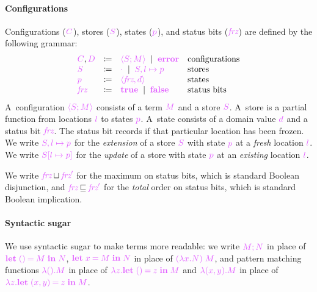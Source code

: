 \documentclass[main.tex]{subfiles}
\begin{document}
\paragraph*{Configurations}
Configurations ($\tm{C}$), stores ($\tm{S}$), states ($\tm{p}$), and status bits ($\tm{\frz}$) are defined by the following grammar:
\[
\begin{array}{lrll}
  \tm{C}, \tm{D}
  & \coloneqq & \tm{\config{M}{S}}
    \sep        \tm{\error}        & \text{configurations}
  \\
  \tm{S}
  & \coloneqq & \tm{\storeemp}
    \sep        \tm{\storeext{S}{l}{p}} & \text{stores}
  \\
  \tm{p}
  & \coloneqq & \tm{\langle \frz, d \rangle} & \text{states}
  \\
  \tm{\frz}
  & \coloneqq & \tm{\true}
    \sep        \tm{\false}
                                    & \text{status bits}
  \end{array}
\]
A~configuration $\tm{\config{M}{S}}$ consists of a term $\tm{M}$ and a store $\tm{S}$. A~store is a partial function from locations $\tm{l}$ to states $\tm{p}$. A~state consists of a domain value $\tm{d}$ and a status bit $\tm{\frz}$. The status bit records if that particular location has been frozen. We write $\tm{\storeext{S}{l}{p}}$ for the \emph{extension} of a store $\tm{S}$ with state $\tm{p}$ at a \emph{fresh} location $\tm{l}$. We write $\tm{\storeupd{S}{l}{p}}$ for the \emph{update} of a store with state $\tm{p}$ at an \emph{existing} location $\tm{l}$.

We write $\tm{\frz}\sqcupB\tm{\frz'}$ for the maximum on status bits, which is standard Boolean disjunction, and $\tm{\frz}\sqsubseteqB\tm{\frz'}$ for the \emph{total} order on status bits, which is standard Boolean implication.

\paragraph*{Syntactic sugar}
We use syntactic sugar to make terms more readable: we write $\tm{\andthen{M}{N}}$ in place of $\tm{\letunit{M}{N}}$, $\tm{\letbind{x}{M}{N}}$ in place of $\tm{(\lambda x.N)\;M}$, and pattern matching functions $\tm{\lambda\unit.M}$ in place of $\tm{\lambda z.\letunit{z}{M}}$ and $\tm{\lambda\pair{x}{y}.M}$ in place of $\tm{\lambda z.\letpair{x}{y}{z}{M}}$.
\end{document}

